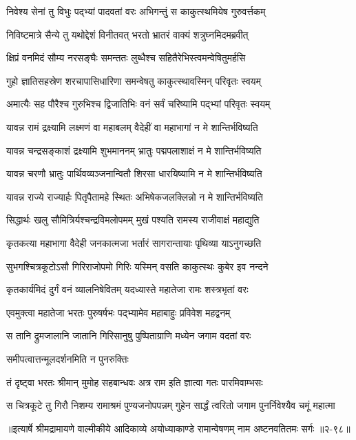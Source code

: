 
\twolineshloka
{निवेश्य सेनां तु विभुः पद्भ्यां पादवतां वरः}
{अभिगन्तुं स काकुत्स्थमियेष गुरुवर्त्तकम्} %

\twolineshloka
{निविष्टमात्रे सैन्ये तु यथोद्देशं विनीतवत्}
{भरतो भ्रातरं वाक्यं शत्रुघ्नमिदमब्रवीत्} %

\twolineshloka
{क्षिप्रं वनमिदं सौम्य नरसङ्घैः समन्ततः}
{लुब्धैश्च सहितैरेभिस्त्वमन्वेषितुमर्हसि} %

\twolineshloka
{गुहो ज्ञातिसहस्रेण शरचापासिधारिणा}
{समन्वेषतु काकुत्स्थावस्मिन् परिवृतः स्वयम्} %

\twolineshloka
{अमात्यैः सह पौरैश्च गुरुभिश्च द्विजातिभिः}
{वनं सर्वं चरिष्यामि पद्भ्यां परिवृतः स्वयम्} %

\twolineshloka
{यावन्न रामं द्रक्ष्यामि लक्ष्मणं वा महाबलम्}
{वैदेहीं वा महाभागां न मे शान्तिर्भविष्यति} %

\twolineshloka
{यावन्न चन्द्रसङ्काशं द्रक्ष्यामि शुभमाननम्}
{भ्रातुः पद्मपलाशाक्षं न मे शान्तिर्भविष्यति} %

\twolineshloka
{यावन्न चरणौ भ्रातुः पार्थिवव्यञ्जनान्वितौ}
{शिरसा धारयिष्यामि न मे शान्तिर्भविष्यति} %

\twolineshloka
{यावन्न राज्ये राज्यार्हः पितृपैतामहे स्थितः}
{अभिषेकजलक्लिन्नो न मे शान्तिर्भविष्यति} %

\twolineshloka
{सिद्धार्थः खलु सौमित्रिर्यश्चन्द्रविमलोपमम्}
{मुखं पश्यति रामस्य राजीवाक्षं महाद्युति} %

\twolineshloka
{कृतकत्या महाभागा वैदेही जनकात्मजा}
{भर्तारं सागरान्तायाः पृथिव्या याऽनुगच्छति} %

\twolineshloka
{सुभगश्चित्रकूटोऽसौ गिरिराजोपमो गिरिः}
{यस्मिन् वसति काकुत्स्थः कुबेर इव नन्दने} %

\twolineshloka
{कृतकार्यमिदं दुर्गं वनं व्यालनिषेवितम्}
{यदध्यास्ते महातेजा रामः शस्त्रभृतां वरः} %

\twolineshloka
{एवमुक्त्वा महातेजा भरतः पुरुषर्षभः}
{पद्भ्यामेव महाबाहुः प्रविवेश महद्वनम्} %

\twolineshloka
{स तानि द्रुमजालानि जातानि गिरिसानुषु}
{पुष्पिताग्राणि मध्येन जगाम वदतां वरः} %

\onelineshloka
{समीपत्वात्तन्मूलदर्शनमिति न पुनरुक्तिः} %

\twolineshloka
{तं दृष्ट्वा भरतः श्रीमान् मुमोह सहबान्धवः}
{अत्र राम इति ज्ञात्वा गतः पारमिवाम्भसः} %

\twolineshloka
{स चित्रकूटे तु गिरौ निशम्य रामाश्रमं पुण्यजनोपपन्नम्}
{गुहेन सार्द्धं त्वरितो जगाम पुनर्निवेश्यैव चमूं महात्मा} %


॥इत्यार्षे श्रीमद्रामायणे वाल्मीकीये आदिकाव्ये अयोध्याकाण्डे रामान्वेषणम् नाम अष्टनवतितमः सर्गः ॥२-९८॥
